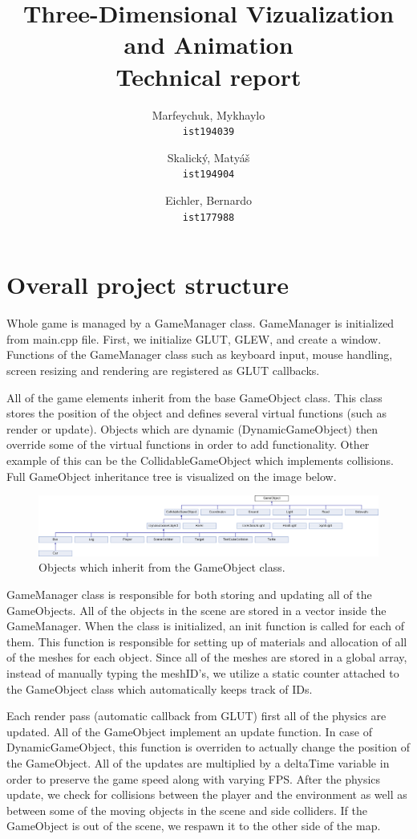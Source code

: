 \documentclass[a4paper,10pt]{article}
\title{Three-Dimensional Vizualization and Animation\\Technical report}
\author{
  Marfeychuk, Mykhaylo\\
  \texttt{ist194039}
  \and
  Skalický, Matyáš\\
  \texttt{ist194904}
  \and
  Eichler, Bernardo\\
  \texttt{ist177988}
}
\date{} %
\begin{document}
\maketitle

\section{Overall project structure}
Whole game is managed by a GameManager class. GameManager is initialized from main.cpp file. First, we initialize GLUT, GLEW, and create a window. Functions of the GameManager class such as keyboard input, mouse handling, screen resizing and rendering are registered as GLUT callbacks.

All of the game elements inherit from the base GameObject class. This class stores the position of the object and defines several virtual functions (such as render or update). Objects which are dynamic (DynamicGameObject) then override some of the virtual functions in order to add functionality. Other example of this can be the CollidableGameObject which implements collisions. Full GameObject inheritance tree is visualized on the image below.

\begin{figure}[!htb]
	\centering
  	\includegraphics[width=\linewidth]{images/image1.png}
  	\caption{Objects which inherit from the GameObject class.}
\end{figure}

GameManager class is responsible for both storing and updating all of the GameObjects. All of the objects in the scene are stored in a vector inside the GameManager. When the class is initialized, an init function is called for each of them. This function is responsible for setting up of materials and allocation of all of the meshes for each object. Since all of the meshes are stored in a global array, instead of manually typing the meshID's, we utilize a static counter attached to the GameObject class which automatically keeps track of IDs.

Each render pass (automatic callback from GLUT) first all of the physics are updated. All of the GameObject implement an update function. In case of DynamicGameObject, this function is overriden to actually change the position of the GameObject. All of the updates are multiplied by a deltaTime variable in order to preserve the game speed along with varying FPS. After the physics update, we check for collisions between the player and the environment as well as between some of the moving objects in the scene and side colliders. If the GameObject is out of the scene, we respawn it to the other side of the map.
\end{document}
